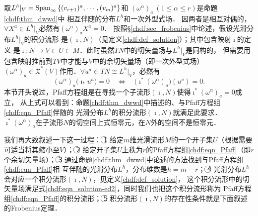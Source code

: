 取$L^h|_V = {\rm Span}_{\infty} \left\{(v_{r+1})^a,\cdots, (v_m)^a \right\}$和
$(\omega^\alpha)_a \ (1 \leqslant \alpha \leqslant r)$是命题\ref{chdf:thm_dwwd}中
相互伴随的分布$L^h$和一次外型式场．
因两者是相互对偶的，$\forall X^a\in L^h|_V$必然有$(\omega^\alpha)_a X^a =0$．
按照\S \ref{chdf:sec_frobenius}中论述，假设光滑分布$L^h|_V$的积分流形
是$(\imath,N)$（见定义\ref{chdf:def_solution}）；其中包含映射$\imath$的定义
是$\imath:N\to V\subset U \subset M$．此时虽然$TN$中的切矢量场与$L^h|_V$是同构的，
但需要用包含映射推前到$TV$中才能与$V$中的余切矢量场（即一次外型式场）
$(\omega^\alpha)_a \in \mathfrak{X}^*(V)$作用．$\forall u^a\in TN \cong L^h|_V$，必然有
\begin{equation}\label{chdf:eqn_solution-ed2}
    (\omega^\alpha)_a \bigl(\imath_{*}u^a\bigr) =0 \quad \Leftrightarrow \quad
    \bigl(\imath^*(\omega^\alpha)_a\bigr) (u^a) =0.
\end{equation}
本节开头说过，Pfaff方程组是在寻找一个子流形$(\imath,N)$使得$\imath^*(\omega^\alpha)_a=0$成立，
从上式可以看到：命题\ref{chdf:thm_dwwd}中描述的、与Pfaff方程组\eqref{chdf:eqn_Pfaff}伴随的
光滑分布$L^h$的积分流形$(\imath,N)$就满足此要求．
$\imath^*(\omega^\alpha)_a$在子流形$N$的切空间上式恒零元，在$N$外的空间不是恒零元．

我们再大致叙述一下这一过程：
\textcircled{1} 给定$m$维光滑流形$M$的一个开子集$U$（根据需要可适当将其缩小至$V$）；
\textcircled{2} 给定开子集$U$上秩为$r$的Pfaff方程组\eqref{chdf:eqn_Pfaff}（即$r$个余切矢量场）；
\textcircled{3} 通过命题\ref{chdf:thm_dwwd}中论述的方法找到与Pfaff方程组\eqref{chdf:eqn_Pfaff}相
互伴随的光滑分布$L^h$，分布维数是$h=m-r$；
\textcircled{4} 光滑分布$L^h$会对应一个积分流形$(\imath,N)$，见定义\ref{chdf:def_solution}，
这个积分流形中的切矢量场满足式\eqref{chdf:eqn_solution-ed2}，同时我们也把这个积分流形称为
Pfaff方程组\eqref{chdf:eqn_Pfaff}的积分流形；
\textcircled{5} 积分流形$(\imath,N)$的存在性条件就是下面叙述的Frobenius定理．

